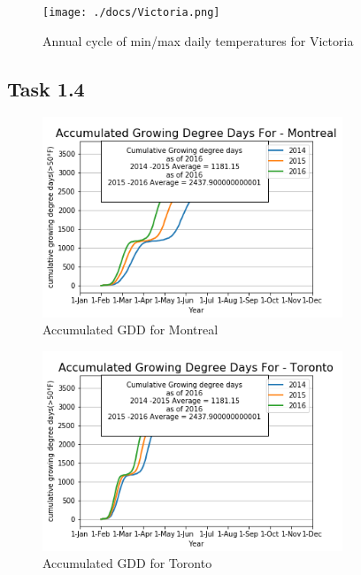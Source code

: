 \documentclass[12pt]{article}
\begin{document}
\begin{figure}[!htbp]
\centering
\texttt{[image: ./docs/Victoria.png]} 
\caption{\scriptsize Annual cycle of min/max daily temperatures for Victoria}
\label{minmax_vict}		  
\end{figure}

\subsection{Task 1.4}	

\begin{figure}[!htbp]
\centering
\includegraphics[width=0.8\textwidth]{./docs/MontrealGDD.png} 
\caption{\scriptsize Accumulated GDD for Montreal}
\label{accuGDD_1}		  
\end{figure}

\begin{figure}[!htbp]
\centering
\includegraphics[width=0.8\textwidth]{./docs/TorontoGDD.png} 
\caption{\scriptsize Accumulated GDD for Toronto}
\label{accuGDD_2}		  
\end{figure}
	
\end{document}
